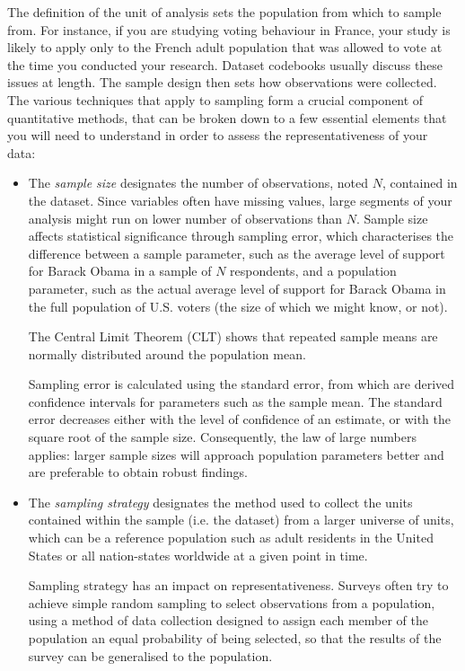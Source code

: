 The definition of the unit of analysis sets the population from which to sample from. For instance, if you are studying voting behaviour in France, your study is likely to apply only to the French adult population that was allowed to vote at the time you conducted your research. Dataset codebooks usually discuss these issues at length.
The sample design then sets how observations were collected. The various techniques that apply to sampling form a crucial component of quantitative methods, that can be broken down to a few essential elements that you will need to understand in order to assess the representativeness of your data:
\begin{itemize}
 \item The \emph{sample size} designates the number of observations, noted $N$, contained in the dataset. Since variables often have missing values, large segments of your analysis might run on lower number of observations than $N$. 
 Sample size affects statistical significance through sampling error, which characterises the difference between a sample parameter, such as the average level of support for Barack Obama in a sample of $N$ respondents, and a population parameter, such as the actual average level of support for Barack Obama in the full population of U.S. voters (the size of which we might know, or not).
 
 The Central Limit Theorem (CLT) shows that repeated sample means are normally distributed around the population mean.
 
 Sampling error is calculated using the standard error, from which are derived confidence intervals for parameters such as the sample mean. The standard error decreases either with the level of confidence of an estimate, or with the square root of the sample size. Consequently, the law of large numbers applies: larger sample sizes will approach population parameters better and are preferable to obtain robust findings.

 \item The \emph{sampling strategy} designates the method used to collect the units contained within the sample (i.e. the dataset) from a larger universe of units, which can be a reference population such as adult residents in the United States or all nation-states worldwide at a given point in time.
 
 Sampling strategy has an impact on representativeness. Surveys often try to achieve simple random sampling to select observations from a population, using a method of data collection designed to assign each member of the population an equal probability of being selected, so that the results of the survey can be generalised to the population.
 

\end{itemize}
